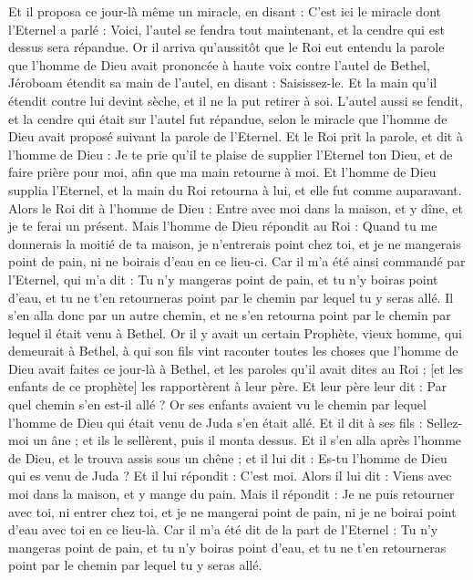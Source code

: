 \begin{multicols}{2}
Et il proposa ce jour-là même un miracle, en disant : C'est ici le miracle dont l'Eternel a parlé : Voici, l'autel se fendra tout maintenant, et la cendre qui est dessus sera répandue.
Or il arriva qu'aussitôt que le Roi eut entendu la parole que l'homme de Dieu avait prononcée à haute voix contre l'autel de Bethel, Jéroboam étendit sa main de l'autel, en disant : Saisissez-le. Et la main qu'il étendit contre lui devint sèche, et il ne la put retirer à soi.
L'autel aussi se fendit, et la cendre qui était sur l'autel fut répandue, selon le miracle que l'homme de Dieu avait proposé suivant la parole de l'Eternel.
Et le Roi prit la parole, et dit à l'homme de Dieu : Je te prie qu'il te plaise de supplier l'Eternel ton Dieu, et de faire prière pour moi, afin que ma main retourne à moi. Et l'homme de Dieu supplia l'Eternel, et la main du Roi retourna à lui, et elle fut comme auparavant.
Alors le Roi dit à l'homme de Dieu : Entre avec moi dans la maison, et y dîne, et je te ferai un présent.
Mais l'homme de Dieu répondit au Roi : Quand tu me donnerais la moitié de ta maison, je n'entrerais point chez toi, et je ne mangerais point de pain, ni ne boirais d'eau en ce lieu-ci.
Car il m'a été ainsi commandé par l'Eternel, qui m'a dit : Tu n'y mangeras point de pain, et tu n'y boiras point d'eau, et tu ne t'en retourneras point par le chemin par lequel tu y seras allé.
Il s'en alla donc par un autre chemin, et ne s'en retourna point par le chemin par lequel il était venu à Bethel.
Or il y avait un certain Prophète, vieux homme, qui demeurait à Bethel, à qui son fils vint raconter toutes les choses que l'homme de Dieu avait faites ce jour-là à Bethel, et les paroles qu'il avait dites au Roi ; [et les enfants de ce prophète] les rapportèrent à leur père.
Et leur père leur dit : Par quel chemin s'en est-il allé ? Or ses enfants avaient vu le chemin par lequel l'homme de Dieu qui était venu de Juda s'en était allé.
Et il dit à ses fils : Sellez-moi un âne ; et ils le sellèrent, puis il monta dessus.
Et il s'en alla après l'homme de Dieu, et le trouva assis sous un chêne ; et il lui dit : Es-tu l'homme de Dieu qui es venu de Juda ? Et il lui répondit : C'est moi.
Alors il lui dit : Viens avec moi dans la maison, et y mange du pain.
Mais il répondit : Je ne puis retourner avec toi, ni entrer chez toi, et je ne mangerai point de pain, ni je ne boirai point d'eau avec toi en ce lieu-là.
Car il m'a été dit de la part de l'Eternel : Tu n'y mangeras point de pain, et tu n'y boiras point d'eau, et tu ne t'en retourneras point par le chemin par lequel tu y seras allé.

\end{multicols}
